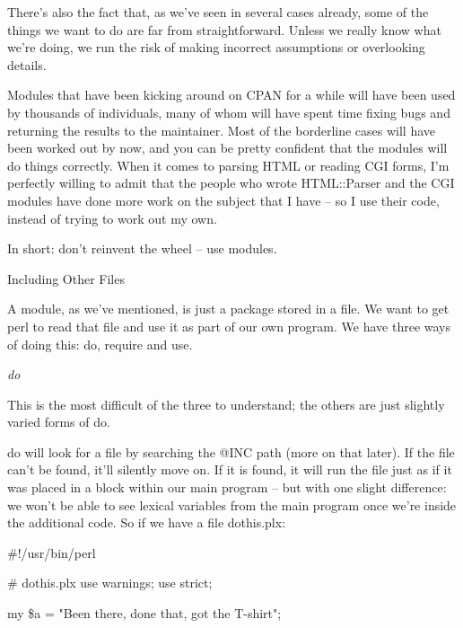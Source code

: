 \documentclass[a4paper,11pt]{book}
\begin{document}
\noindent 

\noindent There's also the fact that, as we've seen in several cases already, some of the things we want to do are far from straightforward. Unless we really know what we're doing, we run the risk of making incorrect assumptions or overlooking details.

\noindent 

\noindent Modules that have been kicking around on CPAN for a while will have been used by thousands of individuals, many of whom will have spent time fixing bugs and returning the results to the maintainer. Most of the borderline cases will have been worked out by now, and you can be pretty confident that the modules will do things correctly. When it comes to parsing HTML or reading CGI forms, I'm perfectly willing to admit that the people who wrote HTML::Parser and the CGI modules have done more work on the subject that I have -- so I use their code, instead of trying to work out my own.

\noindent 

\noindent In short: don't reinvent the wheel -- use modules.

\noindent 

\noindent Including Other Files

\noindent A module, as we've mentioned, is just a package stored in a file. We want to get perl to read that file and use it as part of our own program. We have three ways of doing this: do, require and use.

\noindent 

\noindent \textit{do}

\noindent This is the most difficult of the three to understand; the others are just slightly varied forms of do.

\noindent 

\noindent do will look for a file by searching the @INC path (more on that later). If the file can't be found, it'll silently move on. If it is found, it will run the file just as if it was placed in a block within our main program -- but with one slight difference: we won't be able to see lexical variables from the main program once we're inside the additional code. So if we have a file dothis.plx:

\noindent 

\noindent \#!/usr/bin/perl

\noindent \# dothis.plx use warnings; use strict;

\noindent 

\noindent my \$a = "Been there, done that, got the T-shirt";
\end{document}
